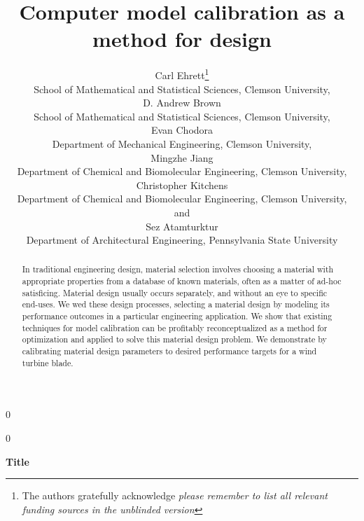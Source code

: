 \documentclass[12pt]{article}
\newcommand{\blind}{0}
\begin{document}
%

\def\spacingset#1{\renewcommand{\baselinestretch}%
{#1}\small\normalsize} \spacingset{1}



\blind
{
  \title{\bf Computer model calibration as a method for design}
  \author{Carl Ehrett\thanks{
    The authors gratefully acknowledge \textit{please remember to list all relevant funding sources in the unblinded version}}\hspace{.2cm}\\
    School of Mathematical and Statistical Sciences, Clemson University,\\
    D. Andrew Brown \\
    School of Mathematical and Statistical Sciences, Clemson University,\\
    Evan Chodora \\
    Department of Mechanical Engineering, Clemson University,\\
    Mingzhe Jiang \\
    Department of Chemical and Biomolecular Engineering, Clemson University,\\
    Christopher Kitchens \\
    Department of Chemical and Biomolecular Engineering, Clemson University,\\
    and \\
    Sez Atamturktur \\
    Department of Architectural Engineering, Pennsylvania State University\\}
  \maketitle
} \fi

\blind
{
  \bigskip
  \bigskip
  \bigskip
  \begin{center}
    {\LARGE\bf Title}
\end{center}
  \medskip
} \fi

\bigskip
\begin{abstract}
In traditional engineering design, material selection involves choosing a material with appropriate properties from a database of known materials, often as a matter of ad-hoc satisficing. 
Material design usually occurs separately, and without an eye to specific end-uses. We wed these design processes, selecting a material design by modeling its performance outcomes in a particular engineering application.
 We show that existing techniques for model calibration can be profitably reconceptualized as a method for optimization and applied to solve this material design problem. 
We demonstrate by calibrating material design parameters to desired performance targets for a wind turbine blade.
\end{abstract}
\end{document}
